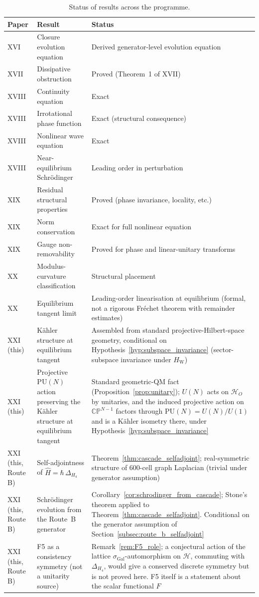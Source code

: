 \documentclass[12pt]{article}
\newcommand{\HW}{H_{\mathrm{W}}}
\newcommand{\sigmaG}{\sigma_{\mathrm{Gal}}}
\begin{document}
\begin{table}[ht]
\centering
\caption{Status of results across the programme.}
\label{tab:status}
\begin{tabular}{@{}llp{6cm}@{}}
\toprule
Paper & Result & Status \\
\midrule
XVI & Closure evolution equation & Derived generator-level evolution equation \\
XVII & Dissipative obstruction & Proved (Theorem~1 of XVII) \\
XVIII & Continuity equation & Exact \\
XVIII & Irrotational phase function & Exact (structural consequence) \\
XVIII & Nonlinear wave equation & Exact \\
XVIII & Near-equilibrium Schr\"odinger & Leading order in perturbation \\
XIX & Residual structural properties & Proved (phase invariance, locality, etc.) \\
XIX & Norm conservation & Exact for full nonlinear equation \\
XIX & Gauge non-removability & Proved for phase and linear-unitary transforms \\
XX & Modulus-curvature classification & Structural placement \\
XX & Equilibrium tangent limit & Leading-order linearisation at equilibrium (formal, not a rigorous Fr\'echet theorem with remainder estimates) \\
XXI (this) & K\"ahler structure at equilibrium tangent & Assembled from standard projective-Hilbert-space geometry, conditional on Hypothesis~\ref{hyp:subspace_invariance} (sector-subspace invariance under $\HW$) \\
XXI (this) & Projective $\mathrm{PU}(N)$ action preserving the K\"ahler structure at equilibrium tangent & Standard geometric-QM fact (Proposition~\ref{prop:unitary}); $U(N)$ acts on $\mathcal{H}_O$ by unitaries, and the induced projective action on $\mathbb{CP}^{N-1}$ factors through $\mathrm{PU}(N) = U(N)/U(1)$ and is a K\"ahler isometry there, under Hypothesis~\ref{hyp:subspace_invariance} \\
XXI (this, Route B) & Self-adjointness of $\hat H = \hbar\,\Delta_{H_4}$ & Theorem~\ref{thm:cascade_selfadjoint}; real-symmetric structure of 600-cell graph Laplacian (trivial under generator assumption) \\
XXI (this, Route B) & Schr\"odinger evolution from the Route~B generator & Corollary~\ref{cor:schrodinger_from_cascade}; Stone's theorem applied to Theorem~\ref{thm:cascade_selfadjoint}. Conditional on the generator assumption of Section~\ref{subsec:route_b_selfadjoint} \\
XXI (this, Route B) & F5 as a consistency symmetry (not a unitarity source) & Remark~\ref{rem:F5_role}; a conjectural action of the lattice $\sigmaG$-automorphism on $\mathcal{H}$, commuting with $\Delta_{H_4}$, would give a conserved discrete symmetry but is not proved here. F5 itself is a statement about the scalar functional $F$ \\
\bottomrule
\end{tabular}
\end{table}
\end{document}
